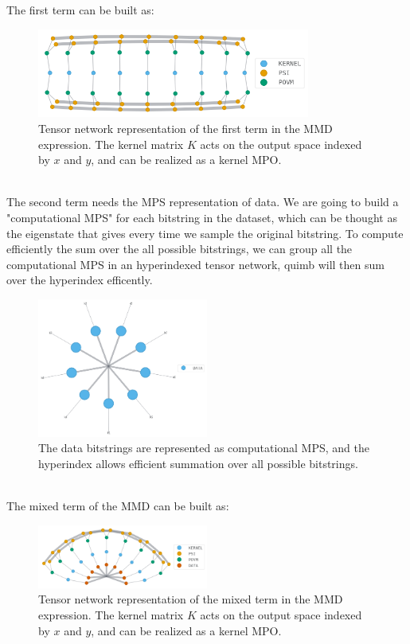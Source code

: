 The first term can be built as:
\begin{figure}[h]
    \centering
    \includegraphics[width=0.8\textwidth]{images/new/overlap_tn.png}
    \caption{Tensor network representation of the first term in the MMD expression. The kernel matrix $ K $ acts on the output space indexed by $ x $ and $ y $, and can be realized as a kernel MPO.}
    \label{fig:overlap_tn}
\end{figure}\\
The second term needs the MPS representation of data. We are going to build a "computational MPS" for each bitstring in the dataset, which can be thought as the eigenstate that gives every time we sample the original bitstring. To compute efficiently the sum over the all possible bitstrings, we can group all the computational MPS in an hyperindexed tensor network, quimb will then sum over the hyperindex efficently.
\begin{figure}[h]
    \centering
    \includegraphics[width=0.5\textwidth]{images/new/data_tn.png}
    \caption{The data bitstrings are represented as computational MPS, and the hyperindex allows efficient summation over all possible bitstrings.}
    \label{fig:data_tn}
\end{figure}\\
The mixed term of the MMD can be built as:
\begin{figure}[h]
    \centering
    \includegraphics[width=0.5\textwidth]{images/new/overlap_data_tn.png}
    \caption{Tensor network representation of the mixed term in the MMD expression. The kernel matrix $ K $ acts on the output space indexed by $ x $ and $ y $, and can be realized as a kernel MPO.}
    \label{fig:overlap_data_tn}
\end{figure}\\

